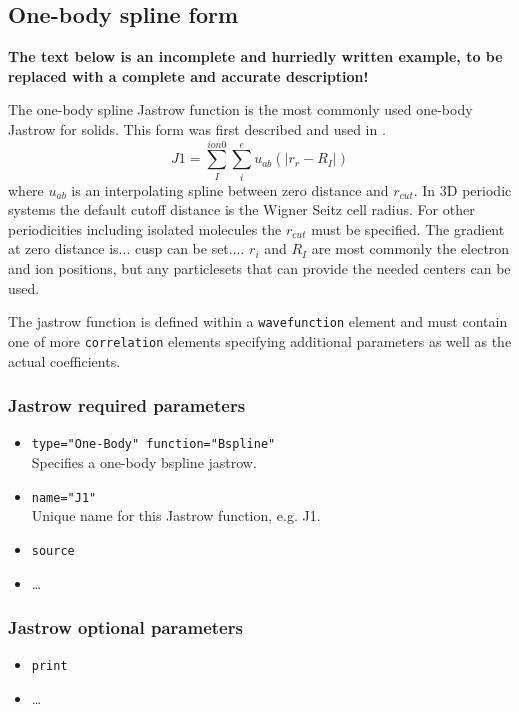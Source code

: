 \subsection{One-body spline form}

\textbf{The text below is an incomplete and hurriedly written example, to be replaced with a complete and accurate description!}

The one-body spline Jastrow function is the most commonly used one-body Jastrow for solids. This form was first described and used in \cite{spline_jastrow}. 
\begin{equation}
J1=\sum_I^{ion0}\sum_i^e u_{ab}(|r_r-R_I|)
\end{equation}
where $u_{ab}$ is an interpolating spline between zero distance and $r_{cut}$. In 3D periodic systems the default cutoff distance is the Wigner Seitz cell radius. For other periodicities including isolated molecules the $r_{cut}$ must be specified. The gradient at zero distance is...  cusp can be set....  $r_i$ and $R_I$ are most commonly the electron and ion positions, but any particlesets that can 
provide the needed centers can be used.

The jastrow function is defined within a \texttt{wavefunction} element and must contain one of more \texttt{correlation} elements specifying additional parameters as well as the actual coefficients.

\subsubsection{Jastrow required parameters}
\begin{itemize}
\item \texttt{type="One-Body" function="Bspline"} \\
Specifies a one-body bspline jastrow.
\item \texttt{name="J1"}\\
Unique name for this Jastrow function, e.g. J1.
\item \texttt{source}
\item \ldots
\end{itemize}
\subsubsection{Jastrow optional parameters}
\begin{itemize}
\item \texttt{print}
\item \ldots
\end{itemize}

